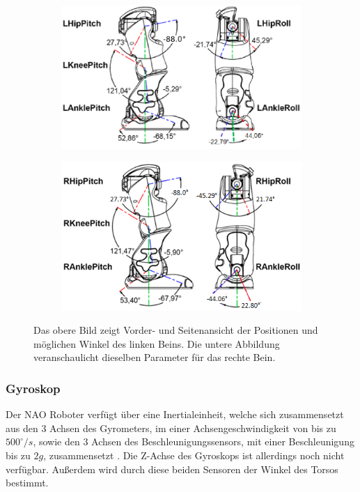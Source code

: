 \begin{figure}[tb]
	\hfill
	\begin{subfigure}[c]{\linewidth}
		\centering
		\includegraphics[width=0.7\linewidth]{Bilder/hardware_llegjoint.png}
	\end{subfigure}
	\begin{subfigure}[c]{\linewidth}
		\centering
		\includegraphics[width=0.7\linewidth]{Bilder/hardware_rlegjoint.png}
	\end{subfigure}
	\hfill
	\caption{Das obere Bild zeigt Vorder- und Seitenansicht der Positionen und möglichen Winkel des linken Beins. Die untere Abbildung veranschaulicht dieselben Parameter für das rechte Bein. \cite[in /kinematics-data/joints]{nao_docu_dev_guide}}
	\label{hardware_legjoint}
\end{figure}

\subsubsection*{Gyroskop}
Der NAO Roboter verfügt über eine Inertialeinheit, welche sich zusammensetzt aus den 3 Achsen des Gyrometers, im einer Achsengeschwindigkeit von bis zu $500^\circ\unit{/s}$, sowie den 3 Achsen des Beschleunigungssensors, mit einer Beschleunigung bis zu $2\unit{g}$, zusammensetzt \cite[/Technical overview/Inertial unit]{nao_docu_dev_guide}. Die Z-Achse des Gyroskops ist allerdings noch nicht verfügbar. Außerdem wird durch diese beiden Sensoren der Winkel des Torsos bestimmt. 
\FloatBarrier

